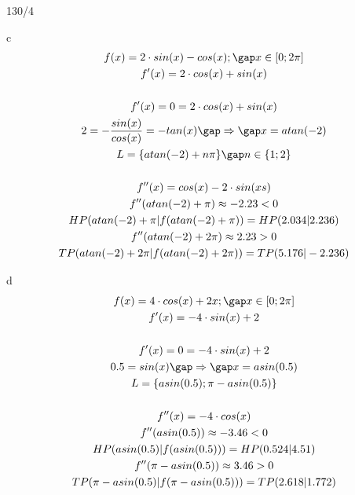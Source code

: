 \newpage
\begin{exercise}{130/4}
  \item [c]
  \begin{gather*}
    f(x) = 2 \cdot sin(x) - cos(x); \gap x \in \left[0; 2\pi\right] \\
    f'(x) = 2 \cdot cos(x) + sin(x) \\\\
    f'(x) = 0 = 2 \cdot cos(x) + sin(x) \\
    2 = -\frac{sin(x)}{cos(x)} = -tan(x) \gap\Rightarrow\gap x = atan(-2) \\
    L = \{atan(-2) + n\pi\} \gap n \in \{1; 2\} \\\\
    f''(x) = cos(x) - 2 \cdot sin(xs) \\
    f''(atan(-2) + \pi) \approx -2.23 < 0 \\
    HP(atan(-2) + \pi|f(atan(-2) + \pi)) = HP(2.034|2.236) \\
    f''(atan(-2) + 2\pi) \approx 2.23 > 0 \\
    TP(atan(-2) + 2\pi|f(atan(-2) + 2\pi)) = TP(5.176|-2.236)
  \end{gather*}
  \item [d]
  \begin{gather*}
    f(x) = 4 \cdot cos(x) + 2x; \gap x \in \left[0; 2\pi\right] \\
    f'(x) = -4 \cdot sin(x) + 2 \\\\
    f'(x) = 0 = -4 \cdot sin(x) + 2 \\
    0.5 = sin(x) \gap\Rightarrow\gap x = asin(0.5) \\
    L = \{asin(0.5); \pi - asin(0.5)\} \\\\
    f''(x) = -4 \cdot cos(x) \\
    f''(asin(0.5)) \approx -3.46 < 0 \\
    HP(asin(0.5)|f(asin(0.5))) = HP(0.524|4.51) \\
    f''(\pi - asin(0.5)) \approx 3.46 > 0 \\
    TP(\pi - asin(0.5)|f(\pi - asin(0.5))) = TP(2.618|1.772)
  \end{gather*}
\end{exercise}
